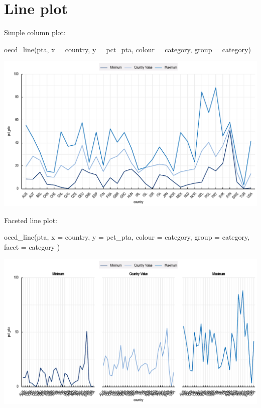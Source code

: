 \documentclass[
  11pt,
  oneside]{report}
\newenvironment{Shaded}{\begin{snugshade}}{\end{snugshade}}
\newcommand{\AttributeTok}[1]{\textcolor[rgb]{0.77,0.63,0.00}{#1}}
\newcommand{\FunctionTok}[1]{\textcolor[rgb]{0.00,0.00,0.00}{#1}}
\newcommand{\NormalTok}[1]{#1}
\begin{document}
\hypertarget{line-plot}{%
\section{Line plot}\label{line-plot}}

Simple column plot:

\begin{Shaded}
\begin{Highlighting}[]
\FunctionTok{oecd\_line}\NormalTok{(pta, }\AttributeTok{x =}\NormalTok{ country, }\AttributeTok{y =}\NormalTok{ pct\_pta, }\AttributeTok{colour =}\NormalTok{ category, }\AttributeTok{group =}\NormalTok{ category)}
\end{Highlighting}
\end{Shaded}

\begin{center}\includegraphics{book_figures/sl1-1} \end{center}

Faceted line plot:

\begin{Shaded}
\begin{Highlighting}[]
\FunctionTok{oecd\_line}\NormalTok{(pta,}
  \AttributeTok{x =}\NormalTok{ country, }\AttributeTok{y =}\NormalTok{ pct\_pta, }\AttributeTok{colour =}\NormalTok{ category, }\AttributeTok{group =}\NormalTok{ category,}
  \AttributeTok{facet =}\NormalTok{ category}
\NormalTok{)}
\end{Highlighting}
\end{Shaded}

\begin{center}\includegraphics{book_figures/sl2-1} \end{center}
\end{document}
